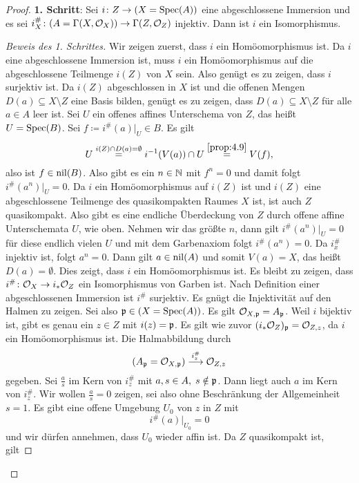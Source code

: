 \begin{thm}
\begin{proof}
		\textbf{1. Schritt}: Sei $i \colon Z \to (X=\operatorname{Spec}(A))$ eine abgeschlossene Immersion und es sei $i_X^{\#}\colon (A=\Gamma(X,\mathcal{O}_X)) \to \Gamma(Z,\mathcal{O}_Z)$ injektiv. Dann ist $i$ ein Isomorphismus.
		\begin{proof}[Beweis des 1. Schrittes]
			Wir zeigen zuerst, dass $i$ ein Homöomorphismus ist. Da $i$ eine abgeschlossene Immersion ist, muss $i$ ein Homöomorphismus auf die abgeschlossene Teilmenge $i(Z)$ von $X$ sein. Also genügt es zu zeigen, dass $i$ surjektiv ist. Da $i(Z)$ abgeschlossen in $X$ ist und die offenen Mengen $D(a)\subseteq X \setminus Z$ eine Basis bilden, genügt es zu zeigen, dass $D(a) \subseteq X \setminus Z$ für alle $a \in A$ leer ist. Sei $U$ ein offenes affines Unterschema von $Z$, das heißt $U=\operatorname{Spec}(B)$. Sei $f\coloneqq i^{\#}(a)\vert_U \in B$. Es gilt
			\[
				U \overset{i(Z) \cap D(a) = \emptyset}{=} i^{-1}(V(a))\cap U \overset{\ref{prop:4.9}}{=} V(f),
			\]
			also ist $f \in \operatorname{nil}(B)$. Also gibt es ein $n \in \mathbb {N}$ mit $f^n = 0$ und damit folgt $i^{\#}(a^n)\vert_U = 0$. Da $i$ ein Homöomorphismus auf $i(Z)$ ist und $i(Z)$ eine abgeschlossene Teilmenge des quasikompakten Raumes $X$ ist, ist auch $Z$ quasikompakt. Also gibt es eine endliche Überdeckung von $Z$ durch offene affine Unterschemata $U$, wie oben. Nehmen wir das größte $n$, dann gilt $i^{\#}(a^n)\vert_U=0$ für diese endlich vielen $U$ und mit dem Garbenaxiom folgt $i^{\#}(a^n)=0$. Da $i^{\#}_x$ injektiv ist, folgt $a^n=0$. Dann gilt $a \in \operatorname{nil}(A)$ und somit $V(a) = X$, das heißt $D(a) = \emptyset$. Dies zeigt, dass $i$ ein Homöomorphismus ist. Es bleibt zu zeigen, dass $i^{\#}\colon\mathcal{O}_X\to i_*\mathcal{O}_Z$ ein Isomorphismus von Garben ist. Nach Definition einer abgeschlossenen Immersion ist $i^{\#}$ surjektiv. Es gnügt die Injektivität auf den Halmen zu zeigen. Sei also $\mathfrak{p} \in (X=\operatorname{Spec}(A))$. Es gilt $\mathcal{O}_{X,\mathfrak{p}} = A_{\mathfrak{p}}$. Weil $i$ bijektiv ist, gibt es genau ein $z \in Z$ mit $i(z) = \mathfrak{p}$. Es gilt wie zuvor $(i_*\mathcal{O}_Z)_{\mathfrak{p}} = \mathcal{O}_{Z,z}$, da $i$ ein Homöomorphismus ist. Die Halmabbildung durch
			\[
				(A_{\mathfrak{p}} = \mathcal{O}_{X,\mathfrak{p}}) \overset{i^{\#}_z}{\longrightarrow}\mathcal{O}_{Z,z}
			\]
			gegeben. Sei $\frac{a}{s}$ im Kern von $i^{\#}_z$ mit $a,s \in A,\; s \notin \mathfrak{p}$. Dann liegt auch $a$ im Kern von $i^{\#}_z$. Wir wollen $\frac{a}{s}=0$ zeigen, sei also ohne Beschränkung der Allgemeinheit $s=1$. Es gibt eine offene Umgebung $U_0$ von $z$ in $Z$ mit
			\begin{equation*}
			\label{eq:7.4.1}\tag{$\star\star$}
				i^{\#}(a)\vert_{U_0} = 0
			\end{equation*}
			und wir dürfen annehmen, dass $U_0$ wieder affin ist. Da $Z$ quasikompakt ist, gilt

\end{proof}
\end{proof}
\end{thm}

